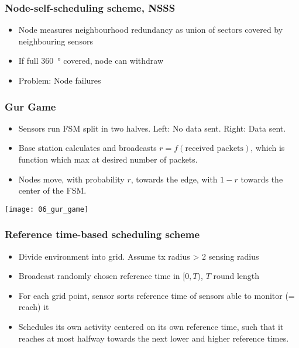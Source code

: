 \subsubsection{Node-self-scheduling scheme, NSSS}

\begin{itemize}
		\item Node measures neighbourhood redundancy as union of sectors covered by neighbouring sensors
		\item If full \SI{360}{\degree} covered, node can withdraw
		\item Problem: Node failures
\end{itemize}

\subsubsection{Gur Game}

\begin{itemize}
		\item Sensors run FSM split in two halves. Left: No data sent. Right: Data sent.
		\item Base station calculates and broadcasts $r = f(\text{received
				packets})$, which is function which max at desired number of
				packets.
		\item Nodes move, with probability $r$, towards the edge, with $1 - r$
				towards the center of the FSM.
\end{itemize}

\texttt{[image: 06\_gur\_game]}

\subsubsection{Reference time-based scheduling scheme}

\begin{itemize}
		\item Divide environment into grid. Assume tx radius > 2 sensing radius
		\item Broadcast randomly chosen reference time in $[0, T)$, $T$ round length
		\item For each grid point, sensor sorts reference time of sensors able to monitor (= reach) it
		\item Schedules its own activity centered on its own reference time,
				such that it reaches at most halfway towards the next lower and
				higher reference times.
\end{itemize}

